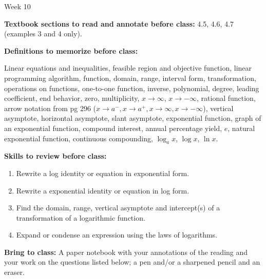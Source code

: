 \documentclass[12pt,dvipsnames]{article}
\begin{document}
\thispagestyle{empty}

	\begin{center}
		{\large{Week 10}}
	\end{center}

{\bfseries{Textbook sections to read and annotate before class:}} 4.5, 4.6, 4.7 (examples 3 and 4 only).

\smallskip

	{\bfseries{Definitions to memorize before class:}} 

\begin{description}[topsep=0pt,itemsep=-2ex,partopsep=0ex,parsep=1ex]
\item[From Weeks 1-9] Linear equations and inequalities, feasible region and objective function, linear programming algorithm,  function, domain, range, interval form, transformation, operations on functions, one-to-one function, inverse, polynomial, degree, leading coefficient, end behavior, zero, multiplicity, $x\to \infty$, $x\to -\infty$, rational function, arrow notation from pg 296 ($x\to a^{-}, x\to a^{+}, x\to \infty, x\to -\infty$), vertical asymptote, horizontal asymptote, slant asymptote, exponential function, graph of an exponential function, compound interest, annual percentage yield, $e$, natural exponential function, continuous compounding, $\log_a x$, $\log x$, $\ln x$.
\end{description}
\smallskip	
	
	{\bfseries{Skills to review before class:} }
\begin{multicols}{2}
		
	\begin{enumerate}[label= {  \arabic*:},labelindent=1em, style = standard,leftmargin=3pc, labelsep=*, itemsep=-2ex,partopsep=0ex,parsep=1ex]
		\item Rewrite a log identity or equation in exponential form.
		\item Rewrite a exponential identity or equation in log form.
		\item Find the domain, range,  vertical asymptote and intercept(s) of a transformation of a logarithmic function.
		\item Expand or condense an expression using the laws of logarithms.
		
	\end{enumerate}
		
\end{multicols}
{\bfseries{Bring to class:} } A paper notebook with your annotations of the reading and your work on the questions listed below; a pen and/or a sharpened pencil and an eraser.
\end{document}
